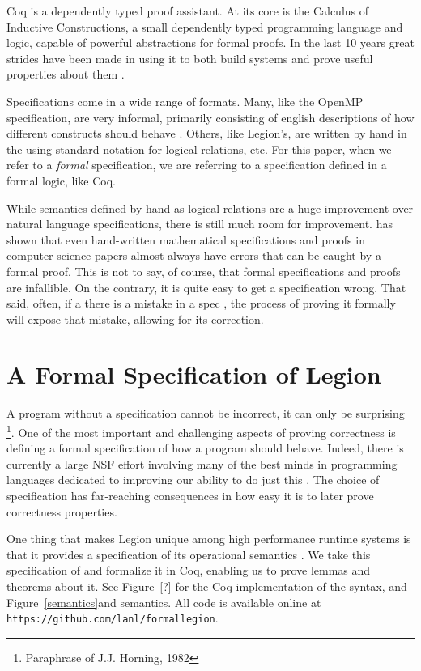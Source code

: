 \documentclass[sigconf]{acmart}
\begin{document}
Coq is a dependently typed proof assistant. At its core is the Calculus of
Inductive Constructions, a small dependently typed programming language and
logic, capable of powerful abstractions for formal proofs. In the last 10 years 
great strides have been made in using it to both build systems and prove useful
properties about them \cite{compcert, certicoq, chlipala...}. 

Specifications come in a wide range of formats. Many, like the OpenMP
specification, are very informal, primarily consisting of english descriptions
of how different constructs should behave \cite{openmp}. Others, like Legion's,
are written by hand in the using standard notation for logical relations, etc.
For this paper, when we refer to a \emph{formal} specification, we are
referring to a specification defined in a formal logic, like Coq. 

While semantics defined by hand as logical relations are a huge improvement
over natural language specifications, there is still much room for improvement.
\cite{formalspec vs paper} has shown that even hand-written mathematical
specifications and proofs in computer science papers almost always have errors
that can be caught by a formal proof.  This is not to say, of course, that
formal specifications and proofs are infallible.  On the contrary, it is quite
easy to get a specification wrong.  That said, often, if a there is a mistake
in a spec , the process of proving it formally will expose that mistake,
allowing for its correction. 

\section{A Formal Specification of Legion}

A program without a specification cannot be incorrect, it can only be
surprising \footnote{Paraphrase of J.J. Horning, 1982}. One of the most
important and challenging aspects of proving correctness is defining a formal
specification of how a program should behave. Indeed, there is currently a
large NSF effort involving many of the best minds in programming languages
dedicated to improving our ability to do just this \cite{deepspec}. The choice
of specification has far-reaching consequences in how easy it is to later prove
correctness properties. 

One thing that makes Legion unique among high performance runtime systems is
that it provides a specification of its operational semantics \cite{oopsla13}.
We take this specification of and formalize it in Coq, enabling us to prove
lemmas and theorems about it. See Figure~\ref{?} for the Coq implementation of
the syntax, and Figure~\ref{semantics}and semantics. All code is available
online at \texttt{https://github.com/lanl/formallegion}. 
\end{document}
